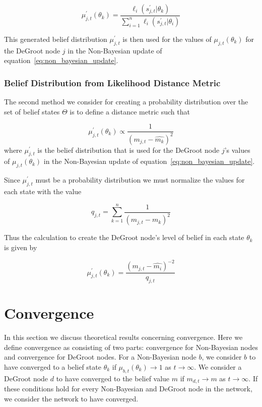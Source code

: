 \documentclass[letterpaper, 11pt, conference]{ieeeconf}
\begin{document}
\begin{equation}
\mu_{j,t}^\prime(\theta_k) = \frac{\ell_i(s_{j,t}^\prime|\theta_k)}{\sum_{i=1}^{n} \ell_i(s_{j,t}^\prime|\theta_i)}
\end{equation}

This generated belief distribution $\mu_{j,t}^\prime$ is then used for the values of $\mu_{j,t}(\theta_k)$ for the DeGroot node $j$ in the Non-Bayesian update of equation~\ref{eq:non_bayesian_update}.

\subsubsection{Belief Distribution from Likelihood Distance Metric}
\label{sec:likelihood_metric}

The second method we consider for creating a probability distribution over the set of belief states $\Theta$ is to define a distance metric such that

\begin{equation}
\mu_{j,t}^\prime(\theta_k) \propto \frac{1}{(m_{j,t}-\hat{m_k})^2}
\end{equation}
where $\mu_{j,t}^\prime$ is the belief distribution that is used for the DeGroot node $j$'s values of $\mu_{j,t}(\theta_k)$ in the Non-Bayesian update of equation~\ref{eq:non_bayesian_update}.

Since $\mu_{j,t}^\prime$ must be a probability distribution we must normalize the values for each state with the value

\begin{equation}
q_{j,t} = \sum_{k=1}^n \frac{1}{(m_{j,t}-\hat{m_k})^2}
\end{equation}

Thus the calculation to create the DeGroot node's level of belief in each state $\theta_k$ is given by

\begin{equation}
\mu_{j,t}^\prime(\theta_k) = \frac{(m_{j,t}-\hat{m_i})^{-2}}{q_{j,t}}
\end{equation}


\section{Convergence}
In this section we discuss theoretical results concerning convergence.  Here we define convergence as consisting of two parts: convergence for Non-Bayesian nodes and convergence for DeGroot nodes.  For a Non-Bayesian node $b$, we consider $b$ to have converged to a belief state $\theta_{k}$ if $\mu_{b,t}(\theta_k) \to 1$ as $t \to \infty$.  We consider a DeGroot node $d$ to have converged to the belief value $m$ if $m_{d,t} \to m$ as $t \to \infty$.  If these conditions hold for every Non-Bayesian and DeGroot node in the network, we consider the network to have converged.
\end{document}
